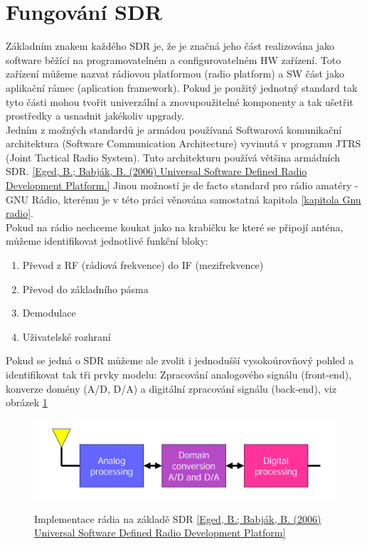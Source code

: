 \documentclass{ctuthesis}
\begin{document}
\section{Fungování SDR}
Základním znakem každého SDR je, že je značná jeho část realizována jako software běžící na programovatelném a configurovatelném HW zařízení. Toto zařízení můžeme nazvat rádiovou platformou (radio platform) a SW část jako aplikační rámec (aplication framework). Pokud je použitý jednotný standard tak tyto části mohou tvořit univerzální a znovupoužitelné komponenty a tak ušetřit prostředky a usnadnit jakékoliv upgrady.\\
Jedním z možných standardů je armádou používaná Softwarová komunikační architektura (Software Communication Architecture) vyvinutá  v programu JTRS (Joint Tactical Radio System). Tuto architekturu používá většina armádních SDR. \ref{Eged, B.; Babják, B. (2006) Universal Software Defined Radio Development Platform.}
Jinou možností je de facto standard pro rádio amatéry - GNU Rádio, kterému je v této práci věnována samostatná kapitola \ref{kapitola Gnu radio}.\\
Pokud na rádio nechceme koukat jako na krabičku ke které se připojí anténa, můžeme identifikovat jednotlivé funkční bloky:
\begin{enumerate}
\item
Převod z RF (rádiová frekvence) do IF (mezifrekvence)
\item
Převod do základního pásma
\item
Demodulace
\item
Uživatelské rozhraní
\end{enumerate}
Pokud se jedná o SDR můžeme ale zvolit i jednodušší vysokoúrovňový pohled a identifikovat tak tři prvky modelu: Zpracování analogového signálu (front-end), konverze domény (A/D, D/A) a digitální zpracování signálu (back-end), viz obrázek \ref{blokySDR}
\begin{figure}
\caption{Implementace rádia na základě SDR \ref{Eged, B.; Babják, B. (2006) Universal Software Defined Radio Development Platform}}
\includegraphics[width=1\textwidth]{./images/funkcniSDRbloky.png}
\label{blokySDR}
\end{figure}
\end{document}
